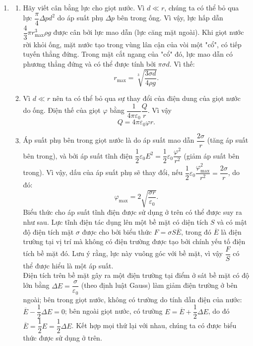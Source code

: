 \begin{loigiai}\[\]
\begin{enumerate}[\bf Phần A.]
    \item 
    \begin{enumerate}[1)]
        \item Hãy viết cân bằng lực cho giọt nước. Vì $d \ll r$, chúng ta có thể bỏ qua lực $\dfrac{\pi}{4} \Delta p d^2$ do áp suất phụ $\Delta p$ bên trong ống. Vì vậy, lực hấp dẫn $\dfrac{4}{3} \pi r_{\max }^{3}\rho g$ được cân bởi lực mao dẫn (lực căng mặt ngoài). Khi giọt nước rời khỏi ống, mặt nước tạo trong vùng lân cận của vòi một "cổ", có tiếp tuyến thẳng đứng. Trong mặt cắt ngang của "cổ" đó, lực mao dẫn có phương thẳng đứng và có thể được tính bởi $\pi \sigma d$. Vì thế:
        \[r_{\max }=\sqrt[3]{\dfrac{3 \sigma d}{4 \rho g}}.\]
        \item Vì $d \ll r$ nên ta có thể bỏ qua sự thay đổi của điện dung của giọt nước do ống. Điện thế của giọt $\varphi$ bằng $\dfrac{1}{4 \pi \varepsilon_{0}} \dfrac{Q}{r}$. Vì vậy
        \[Q = 4 \pi \varepsilon_{0} \varphi r.\]
        \item Áp suất phụ bên trong giọt nước là do áp suất mao dẫn $ \dfrac{2 \sigma}{r}$ (tăng áp suất bên trong), và bởi áp suất tĩnh điện $\dfrac{1}{2} \varepsilon_{0} E^{2} = \dfrac{1}{2} \varepsilon_{0} \dfrac{\varphi^{2}}{r^{2}}$ (giảm áp suất bên trong). Vì vậy, dấu của áp suất phụ sẽ thay đổi, nếu $\dfrac{1}{2} \varepsilon_{0} \dfrac{\varphi_{\max}^{2}}{r^{2}}=\dfrac{2 \sigma}{r}$, do đó:
        \[\varphi_{\max }=2 \sqrt{\dfrac{\sigma r}{\varepsilon_{0}}}.\]
        Biểu thức cho áp suất tĩnh điện được sử dụng ở trên có thể được suy ra như sau. Lực tĩnh điện tác dụng lên một bề mặt có diện tích ${S}$ và có mật độ điện tích mặt $\sigma$ được cho bởi biểu thức $F=\sigma S \overline{E}$, trong đó $\overline{E}$ là điện trường tại vị trí mà không có điện trường được tạo bởi chính yếu tố điện tích bề mặt đó. Lưu ý rằng, lực này vuông góc với bề mặt, vì vậy $\dfrac{F}{S}$ có thể được hiểu là một áp suất.\\
        Điện tích trên bề mặt gây ra một điện trường tại điểm ở sát bề mặt có độ lớn bằng $\Delta E = \dfrac{\sigma}{\varepsilon_0}$ (theo định luật Gauss) làm giảm điện trường ở bên ngoài; bên trong giọt nước, không có trường do  tính dẫn điện của nước: $\overline{E} - \dfrac{1}{2}\Delta E = 0$; bên ngoài giọt nước, có trường $E = \overline{E} + \dfrac{1}{2}\Delta  E$, do đó $\overline{E} = \dfrac{1}{2}E = \dfrac{1}{2}\Delta E$. Kết hợp mọi thứ lại với nhau, chúng ta có được biểu thức được sử dụng ở trên.\\

\end{enumerate}
\end{enumerate}
\end{loigiai}
